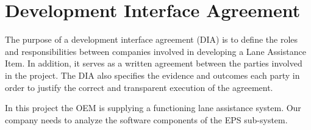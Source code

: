 \chapter{Development Interface Agreement}
\label{ch:development_interface_agreement}


 
The purpose of a development interface agreement (DIA) is to define the roles and responsibilities
between companies involved in developing a Lane Assistance Item. 
In addition, it serves as a written agreement between the parties involved 
in the project.
The DIA also specifies the evidence and outcomes each party in order
to justify the correct and transparent execution of the agreement.


In this project the OEM is supplying a functioning lane assistance
system. Our company needs to analyze the software components of the 
EPS sub-system.
